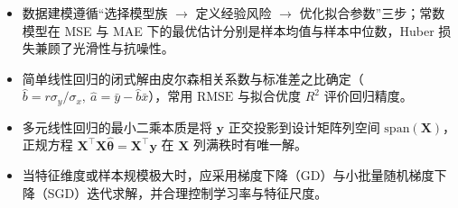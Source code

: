 \begin{summary}[本章要点]
\begin{itemize}
  \item 数据建模遵循“选择模型族 $\to$ 定义经验风险 $\to$ 优化拟合参数”三步；常数模型在 MSE 与 MAE 下的最优估计分别是样本均值与样本中位数，Huber 损失兼顾了光滑性与抗噪性。
  \item 简单线性回归的闭式解由皮尔森相关系数与标准差之比确定（$\hat{b}=r\sigma_y/\sigma_x,\ \hat{a}=\bar{y}-\hat{b}\bar{x}$），常用 $\mathrm{RMSE}$ 与拟合优度 $R^2$ 评价回归精度。
  \item 多元线性回归的最小二乘本质是将 $\bm{y}$ 正交投影到设计矩阵列空间 $\mathrm{span}(\bm{X})$，正规方程 $\bm{X}^\top\bm{X}\hat{\bm{\theta}}=\bm{X}^\top\bm{y}$ 在 $\bm{X}$ 列满秩时有唯一解。
  \item 当特征维度或样本规模极大时，应采用梯度下降（GD）与小批量随机梯度下降（SGD）迭代求解，并合理控制学习率与特征尺度。
\end{itemize}
\end{summary}

